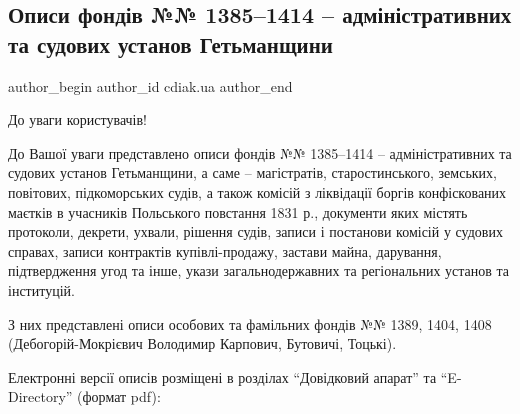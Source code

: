  
 
 
 
 

\subsection{Описи фондів №№ 1385–1414 – адміністративних та судових установ Гетьманщини}
\label{sec:26_06_2023.fb.cdiak.ua.1.opysy_fondiv_nn_1385_1414_admin_sud_ustanovy_getmanschyny}

\ifcmt
 author_begin
   author_id cdiak.ua
 author_end
\fi

До уваги користувачів!

До Вашої уваги представлено описи фондів №№ 1385–1414 – адміністративних та
судових установ Гетьманщини, а саме –  магістратів, старостинського, земських,
повітових, підкоморських судів, а  також комісій з ліквідації боргів
конфіскованих маєтків в учасників Польського повстання 1831 р., документи яких
містять протоколи, декрети, ухвали, рішення судів, записи і постанови комісій у
судових справах, записи контрактів купівлі-продажу, застави майна, дарування,
підтвердження угод та інше, укази загальнодержавних та регіональних установ та
інституцій.

З них представлені описи особових та фамільних фондів №№ 1389, 1404, 1408
(Дебогорій-Мокрієвич Володимир Карпович, Бутовичі, Тоцькі).

Електронні версії описів розміщені в розділах \enquote{Довідковий апарат} та
\enquote{E-Directory} (формат pdf):

